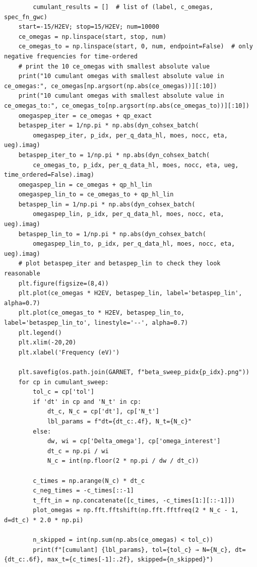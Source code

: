 \begin{verbatim}
        cumulant_results = []  # list of (label, c_omegas, spec_fn_gwc)
    start=-15/H2EV; stop=15/H2EV; num=10000
    ce_omegas = np.linspace(start, stop, num)
    ce_omegas_to = np.linspace(start, 0, num, endpoint=False)  # only negative frequencies for time-ordered
    # print the 10 ce_omegas with smallest absolute value
    print("10 cumulant omegas with smallest absolute value in ce_omegas:", ce_omegas[np.argsort(np.abs(ce_omegas))][:10])
    print("10 cumulant omegas with smallest absolute value in ce_omegas_to:", ce_omegas_to[np.argsort(np.abs(ce_omegas_to))][:10])
    omegaspep_iter = ce_omegas + qp_exact
    betaspep_iter = 1/np.pi * np.abs(dyn_cohsex_batch(
        omegaspep_iter, p_idx, per_q_data_hl, moes, nocc, eta, ueg).imag)
    betaspep_iter_to = 1/np.pi * np.abs(dyn_cohsex_batch(
        ce_omegas_to, p_idx, per_q_data_hl, moes, nocc, eta, ueg, time_ordered=False).imag)
    omegaspep_lin = ce_omegas + qp_hl_lin
    omegaspep_lin_to = ce_omegas_to + qp_hl_lin
    betaspep_lin = 1/np.pi * np.abs(dyn_cohsex_batch(
        omegaspep_lin, p_idx, per_q_data_hl, moes, nocc, eta, ueg).imag)
    betaspep_lin_to = 1/np.pi * np.abs(dyn_cohsex_batch(
        omegaspep_lin_to, p_idx, per_q_data_hl, moes, nocc, eta, ueg).imag)
    # plot betaspep_iter and betaspep_lin to check they look reasonable
    plt.figure(figsize=(8,4))
    plt.plot(ce_omegas * H2EV, betaspep_lin, label='betaspep_lin', alpha=0.7)
    plt.plot(ce_omegas_to * H2EV, betaspep_lin_to, label='betaspep_lin_to', linestyle='--', alpha=0.7)
    plt.legend()
    plt.xlim(-20,20)
    plt.xlabel('Frequency (eV)')

    plt.savefig(os.path.join(GARNET, f"beta_sweep_pidx{p_idx}.png"))
    for cp in cumulant_sweep:
        tol_c = cp['tol']
        if 'dt' in cp and 'N_t' in cp:
            dt_c, N_c = cp['dt'], cp['N_t']
            lbl_params = f"dt={dt_c:.4f}, N_t={N_c}"
        else:
            dw, wi = cp['Delta_omega'], cp['omega_interest']
            dt_c = np.pi / wi
            N_c = int(np.floor(2 * np.pi / dw / dt_c))

        c_times = np.arange(N_c) * dt_c
        c_neg_times = -c_times[::-1]
        t_fft_in = np.concatenate([c_times, -c_times[1:][::-1]])
        plot_omegas = np.fft.fftshift(np.fft.fftfreq(2 * N_c - 1, d=dt_c) * 2.0 * np.pi)

        n_skipped = int(np.sum(np.abs(ce_omegas) < tol_c))
        print(f"[cumulant] {lbl_params}, tol={tol_c} → N={N_c}, dt={dt_c:.6f}, max_t={c_times[-1]:.2f}, skipped={n_skipped}")


\end{verbatim}
